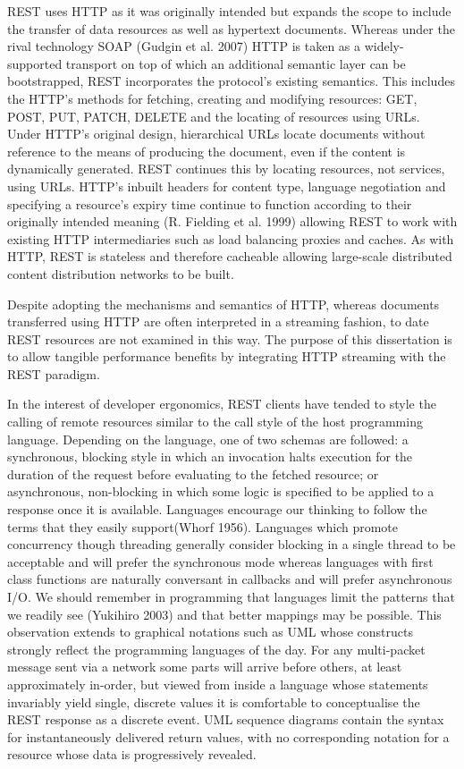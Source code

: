\documentclass[12pt, ]{article}
\begin{document}
REST uses HTTP as it was originally intended but expands the scope to
include the transfer of data resources as well as hypertext documents.
Whereas under the rival technology SOAP (Gudgin et al. 2007) HTTP is
taken as a widely-supported transport on top of which an additional
semantic layer can be bootstrapped, REST incorporates the protocol's
existing semantics. This includes the HTTP's methods for fetching,
creating and modifying resources: GET, POST, PUT, PATCH, DELETE and the
locating of resources using URLs. Under HTTP's original design,
hierarchical URLs locate documents without reference to the means of
producing the document, even if the content is dynamically generated.
REST continues this by locating resources, not services, using URLs.
HTTP's inbuilt headers for content type, language negotiation and
specifying a resource's expiry time continue to function according to
their originally intended meaning (R. Fielding et al. 1999) allowing
REST to work with existing HTTP intermediaries such as load balancing
proxies and caches. As with HTTP, REST is stateless and therefore
cacheable allowing large-scale distributed content distribution networks
to be built.

Despite adopting the mechanisms and semantics of HTTP, whereas documents
transferred using HTTP are often interpreted in a streaming fashion, to
date REST resources are not examined in this way. The purpose of this
dissertation is to allow tangible performance benefits by integrating
HTTP streaming with the REST paradigm.

In the interest of developer ergonomics, REST clients have tended to
style the calling of remote resources similar to the call style of the
host programming language. Depending on the language, one of two schemas
are followed: a synchronous, blocking style in which an invocation halts
execution for the duration of the request before evaluating to the
fetched resource; or asynchronous, non-blocking in which some logic is
specified to be applied to a response once it is available. Languages
encourage our thinking to follow the terms that they easily
support(Whorf 1956). Languages which promote concurrency though
threading generally consider blocking in a single thread to be
acceptable and will prefer the synchronous mode whereas languages with
first class functions are naturally conversant in callbacks and will
prefer asynchronous I/O. We should remember in programming that
languages limit the patterns that we readily see (Yukihiro 2003) and
that better mappings may be possible. This observation extends to
graphical notations such as UML whose constructs strongly reflect the
programming languages of the day. For any multi-packet message sent via
a network some parts will arrive before others, at least approximately
in-order, but viewed from inside a language whose statements invariably
yield single, discrete values it is comfortable to conceptualise the
REST response as a discrete event. UML sequence diagrams contain the
syntax for instantaneously delivered return values, with no
corresponding notation for a resource whose data is progressively
revealed.
\end{document}
